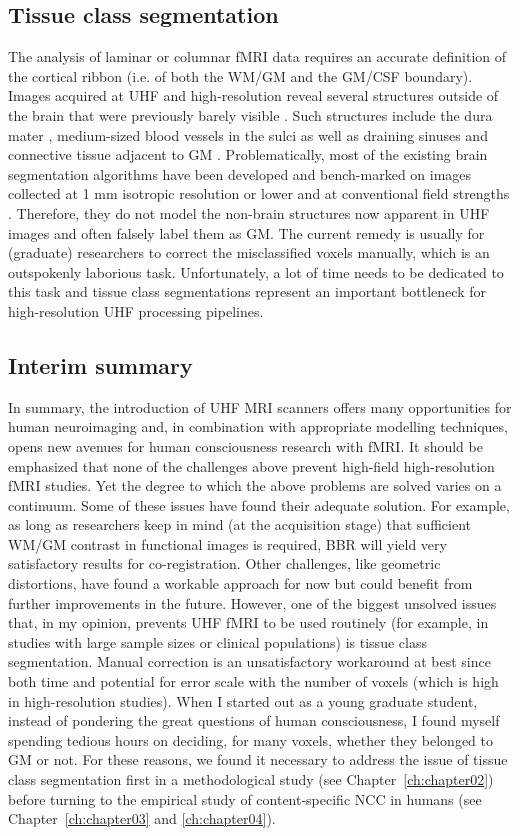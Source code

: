 \subsection{Tissue class segmentation}
The analysis of laminar or columnar fMRI data requires an accurate definition of the cortical ribbon (i.e. of both the WM/GM and the GM/CSF boundary). Images acquired at UHF and high-resolution reveal several structures outside of the brain that were previously barely visible \parencite{Viviani2017}. Such structures include the dura mater \parencite{VanderKouwe2008}, medium-sized blood vessels in the sulci \parencite{Viviani2016} as well as draining sinuses and connective tissue adjacent to GM \parencite{Helms2006}. Problematically, most of the existing brain segmentation algorithms have been developed and bench-marked on images collected at 1 mm isotropic resolution or lower and at conventional field strengths \parencite{Helms2016}. Therefore, they do not model the non-brain structures now apparent in UHF images and often falsely label them as GM. The current remedy is usually for (graduate) researchers to correct the misclassified voxels manually, which is an outspokenly laborious task. Unfortunately, a lot of time needs to be dedicated to this task and tissue class segmentations represent an important bottleneck for high-resolution UHF processing pipelines.

\subsection{Interim summary}
In summary, the introduction of UHF MRI scanners offers many opportunities for human neuroimaging and, in combination with appropriate modelling techniques, opens new avenues for human consciousness research with fMRI. It should be emphasized that none of the challenges above prevent high-field high-resolution fMRI studies. Yet the degree to which the above problems are solved varies on a continuum. Some of these issues have found their adequate solution. For example, as long as researchers keep in mind (at the acquisition stage) that sufficient WM/GM contrast in functional images is required, BBR will yield very satisfactory results for co-registration. Other challenges, like geometric distortions, have found a workable approach for now but could benefit from further improvements in the future. However, one of the biggest unsolved issues that, in my opinion, prevents UHF fMRI to be used routinely (for example, in studies with large sample sizes or clinical populations) is tissue class segmentation. Manual correction is an unsatisfactory workaround at best since both time and potential for error scale with the number of voxels (which is high in high-resolution studies). When I started out as a young graduate student, instead of pondering the great questions of human consciousness, I found myself spending tedious hours on deciding, for many voxels, whether they belonged to GM or not. For these reasons, we found it necessary to address the issue of tissue class segmentation first in a methodological study (see Chapter~\ref{ch:chapter02}) before turning to the empirical study of content-specific NCC in humans (see Chapter~\ref{ch:chapter03} and \ref{ch:chapter04}).

